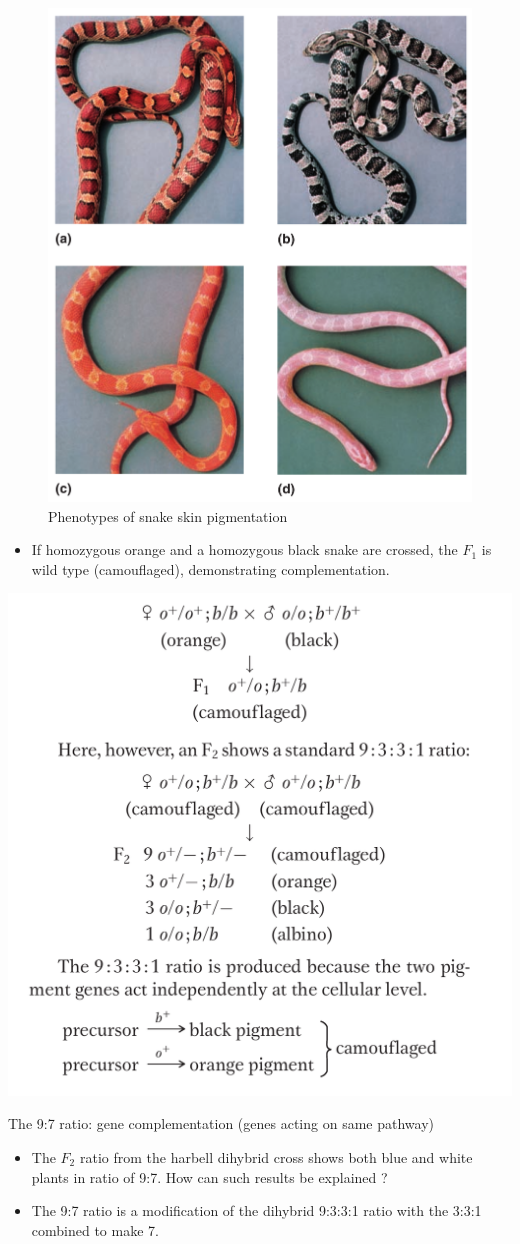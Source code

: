 \documentclass[11pt,dvipsnames,ignorenonframetext,aspectratio=169]{beamer}
\providecommand{\tightlist}{%
  \setlength{\itemsep}{0pt}\setlength{\parskip}{0pt}}
\begin{document}
\begin{frame}{}
\protect\hypertarget{section-11}{}
\begin{figure}

{\centering \includegraphics[width=0.42\linewidth]{./../images/gene_no_interaction} 

}

\caption{Phenotypes of snake skin pigmentation}\label{fig:gene-no-interaction1}
\end{figure}
\end{frame}

\begin{frame}{}
\protect\hypertarget{section-12}{}
\begin{itemize}
\tightlist
\item
  If homozygous orange and a homozygous black snake are crossed, the
  \(F_1\) is wild type (camouflaged), demonstrating complementation.
\end{itemize}

\begin{center}\includegraphics[width=0.4\linewidth]{./../images/gene_no_interaction2} \end{center}
\end{frame}

\begin{frame}{The 9:7 ratio: gene complementation (genes acting on same
pathway)}
\protect\hypertarget{the-97-ratio-gene-complementation-genes-acting-on-same-pathway}{}
\begin{itemize}
\tightlist
\item
  The \(F_2\) ratio from the harbell dihybrid cross shows both blue and
  white plants in ratio of 9:7. How can such results be explained ?
\item
  The 9:7 ratio is a modification of the dihybrid 9:3:3:1 ratio with the
  3:3:1 combined to make 7.
\end{itemize}
\end{frame}
\end{document}
